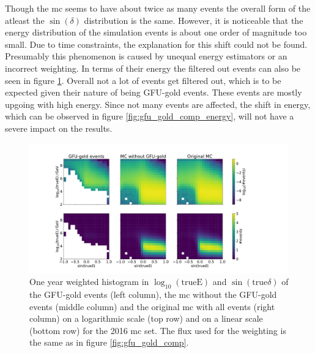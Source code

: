 Though the mc seems to have about twice as many events the overall form of the atleast the $\sin{(\delta)}$ distribution is the same.
However, it is noticeable that the energy distribution of the simulation events is about one order of magnitude too small.
Due to time constraints, the explanation for this shift could not be found.
Presumably this phenomenon is caused by unequal energy estimators or an incorrect weighting.
In terms of their energy the filtered out events can also be seen in figure \ref{fig:energy}.
Overall not a lot of events get filtered out, which is to be expected given their nature of being GFU-gold events.
These events are mostly upgoing with high energy.
Since not many events are affected, the shift in energy, which can be observed in figure \ref{fig:gfu_gold_comp_energy}, will not have a severe impact on the results.
\begin{figure}
    \centering
    \includegraphics[width=16cm]{Plots/03_data/cleaned_mc_energy_test.pdf}
    \caption{One year weighted histogram in $\log_{10}(\text{trueE})$ and $\sin{(\text{true}\delta)}$ of the GFU-gold events (left column), the mc without the GFU-gold events (middle column) and the original mc with all events (right column) on a logarithmic scale (top row) and on a linear scale (bottom row) for the 2016 mc set. The flux used for the weighting is the same as in figure \ref{fig:gfu_gold_comp}.}
    \label{fig:energy}
\end{figure}
